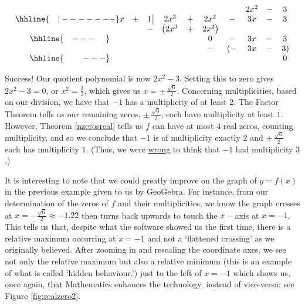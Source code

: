 {\begin{enumerate}
{}
{

\setlength\arraycolsep{0.1pt}
\setlength\extrarowheight{2pt}

\[ \begin{array}{cccccccccc}

& & & & & & & 2x^2 & - & 3 \\ \hhline{~~~|-------}

x & + & 1 \, \vline& 2x^3 & + & 2x^2 & - & 3x & - & 3\\

 &  &  -& \left(2x^3 \right. & + & \left.  2x^2\right) &  &  &  &  \\ \hhline{~~~---~~~~} 
 &  &  &   &   & 0 & - & 3x  & - & 3 \\ 
 &  &  &   &   & - & \left(-\right. & 3x & - & \left.3\right) \\  \hhline{~~~~~~~---} 
 &   &  &  &  &  &  &  &  & 0
 
\end{array}\]

\setlength\arraycolsep{5pt}
\setlength\extrarowheight{0pt}

}
Success!  Our quotient polynomial is now $2x^2 - 3$.  Setting this to zero gives $2x^2 - 3 = 0$, or $x^2 = \frac{3}{2}$, which gives us $x = \pm \, \frac{\sqrt{6}}{2}$.  Concerning multiplicities, based on our division, we have that $-1$ has a multiplicity of at least $2$. The Factor Theorem tells us our remaining zeros, $\pm \, \frac{\sqrt{6}}{2}$, each have multiplicity at least $1$.  However, Theorem \ref{nzerosreal} tells us $f$ can have at most $4$ real zeros, counting multiplicity, and so we conclude that $-1$ is of multiplicity exactly $2$ and $\pm \, \frac{\sqrt{6}}{2}$ each has multiplicity $1$.  (Thus, we were \underline{wrong} to think that $-1$ had multiplicity $3$.) 

\end{enumerate}
}

\medskip

It is interesting to note that we could greatly improve on the graph of $y=f(x)$ in the previous example given to us by GeoGebra. For instance, from our determination of the zeros of $f$ and their multiplicities, we know the graph crosses at $x=-\frac{\sqrt{6}}{2} \approx -1.22$ then turns back upwards to touch the $x-$axis at $x=-1$. This tells us that, despite what the software showed us the first time, there is a relative maximum occurring at $x = -1$ and not a `flattened crossing' as we originally believed.  After zooming in and rescaling the coordinate axes, we see not only the relative maximum but also a relative minimum (this is an example of what is called `hidden behaviour.') just to the left of $x = -1$ which shows us, once again, that Mathematics enhances the technology, instead of vice-versa: see Figure \ref{fig:realzero2}.

